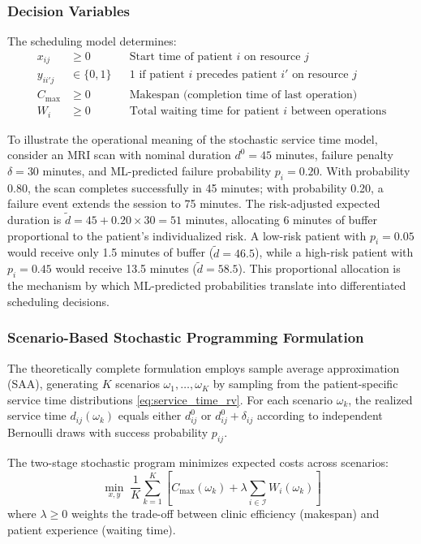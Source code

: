 \documentclass[11pt,a4paper]{article}
\begin{document}
\subsubsection{Decision Variables}

The scheduling model determines:
\begin{align}
x_{ij} &\geq 0 && \text{Start time of patient } i \text{ on resource } j \\
y_{ii'j} &\in \{0, 1\} && \text{1 if patient } i \text{ precedes patient } i' \text{ on resource } j \\
C_{\max} &\geq 0 && \text{Makespan (completion time of last operation)} \\
W_i &\geq 0 && \text{Total waiting time for patient } i \text{ between operations}
\end{align}


To illustrate the operational meaning of the stochastic service time model, consider an MRI scan with nominal duration $d^0 = 45$ minutes, failure penalty $\delta = 30$ minutes, and ML-predicted failure probability $p_i = 0.20$. With probability 0.80, the scan completes successfully in 45 minutes; with probability 0.20, a failure event extends the session to 75 minutes. The risk-adjusted expected duration is $\tilde{d} = 45 + 0.20 \times 30 = 51$ minutes, allocating 6 minutes of buffer proportional to the patient's individualized risk. A low-risk patient with $p_i = 0.05$ would receive only 1.5 minutes of buffer ($\tilde{d} = 46.5$), while a high-risk patient with $p_i = 0.45$ would receive 13.5 minutes ($\tilde{d} = 58.5$). This proportional allocation is the mechanism by which ML-predicted probabilities translate into differentiated scheduling decisions.


\subsubsection{Scenario-Based Stochastic Programming Formulation}

The theoretically complete formulation employs sample average approximation (SAA), generating $K$ scenarios $\omega_1, \ldots, \omega_K$ by sampling from the patient-specific service time distributions \eqref{eq:service_time_rv}. For each scenario $\omega_k$, the realized service time $d_{ij}(\omega_k)$ equals either $d_{ij}^0$ or $d_{ij}^0 + \delta_{ij}$ according to independent Bernoulli draws with success probability $p_{ij}$.

The two-stage stochastic program minimizes expected costs across scenarios:
\begin{equation}
\min_{x, y} \; \frac{1}{K} \sum_{k=1}^{K} \left[ C_{\max}(\omega_k) + \lambda \sum_{i \in \mathcal{I}} W_i(\omega_k) \right]
\label{eq:saa_objective}
\end{equation}
where $\lambda \geq 0$ weights the trade-off between clinic efficiency (makespan) and patient experience (waiting time).
\end{document}
